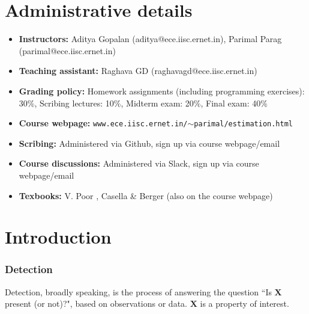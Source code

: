 \documentclass[12pt]{report}
\begin{document}
\maketitle


\section{Administrative details}
\begin{itemize}
\item {\bf Instructors:} Aditya Gopalan (aditya@ece.iisc.ernet.in), Parimal Parag (parimal@ece.iisc.ernet.in)
\item {\bf Teaching assistant:} Raghava GD (raghavagd@ece.iisc.ernet.in)
\item {\bf Grading policy:} Homework assignments (including programming exercises): 30\%, Scribing lectures: 10\%, Midterm exam: 20\%, Final exam: 40\%
\item {\bf Course webpage:} {\tt www.ece.iisc.ernet.in/$\sim$parimal/estimation.html}
\item {\bf Scribing:} Administered via Github, sign up via course webpage/email
\item {\bf Course discussions:} Administered via Slack, sign up via course webpage/email
\item {\bf Texbooks:} V. Poor \cite{Poor}, Casella \& Berger \cite{CaseBerg:01} (also on the course webpage)
\end{itemize}

\section{Introduction}
\subsubsection{Detection}
Detection, broadly speaking, is the process of answering the question ``Is $\mathbf{X}$ present (or not)?", based on observations or data. $\mathbf{X}$ is a property of interest. \\
\end{document}
